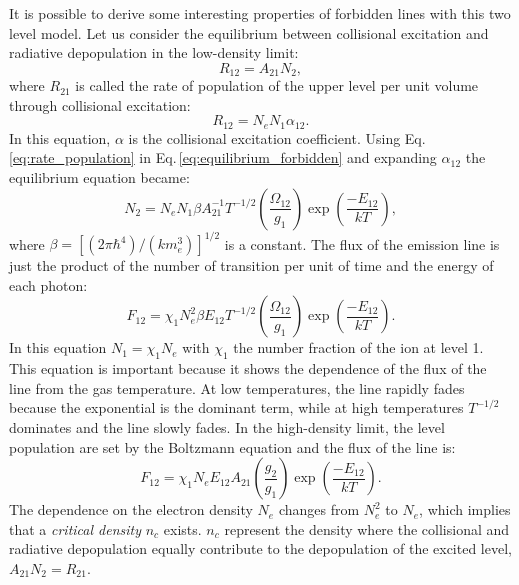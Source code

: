 \documentclass[../main.tex]{subfiles}
\begin{document}
It is possible to derive some interesting properties of forbidden lines with this two level model.
Let us consider the equilibrium between collisional excitation and radiative depopulation in the low-density limit:
\begin{equation}
    \label{eq:equilibrium_forbidden}
    R_{12} = A_{21}N_2,
\end{equation} 
where $R_{21}$ is called the rate of population of the upper level per unit volume through collisional excitation:
\begin{equation}
    \label{eq:rate_population}
    R_{12} = N_eN_1 \alpha_{12}.
\end{equation}
In this equation, $\alpha$ is the collisional excitation coefficient.
Using Eq.\,\ref{eq:rate_population} in Eq.\,\ref{eq:equilibrium_forbidden} and expanding $\alpha_{12}$ the equilibrium equation became:
\begin{equation}
    \label{eq:equilibrium_forbidden2}
    N_2 = N_e N_1 \beta A_{21}^{-1}T^{-1/2}\left(\frac{\Omega_{12}}{g_1}\right)\exp\left(\frac{-E_{12}}{kT}\right),
\end{equation}
where $\beta = [(2\pi \hbar^4)/(km_e^3)]^{1/2}$ is a constant.
The flux of the emission line is just the product of the number of transition per unit of time and the energy of each photon:
\begin{equation}
    \label{eq:flux}
    F_{12} = \chi_1 N_e^2 \beta E_{12} T^{-1/2} \left(\frac{\Omega_{12}}{g_1}\right) \exp\left(\frac{-E_{12}}{kT}\right).
\end{equation}
In this equation $N_1 = \chi_1N_e$ with $\chi_1$ the number fraction of the ion at level 1.
This equation is important because it shows the dependence of the flux of the line from the gas temperature.
At low temperatures, the line rapidly fades because the exponential is the dominant term, while at high temperatures $T^{-1/2}$ dominates and the line slowly fades.
In the high-density limit, the level population are set by the Boltzmann equation and the flux of the line is:
\begin{equation}
    \label{eq:flux_boltz}
    F_{12} = \chi_1 N_e E_{12} A_{21} \left(\frac{g_2}{g_1}\right) \exp\left(\frac{-E_{12}}{kT}\right).
\end{equation}
The dependence on the electron density $N_e$ changes from $N_e^2$ to $N_e$, which implies that a \emph{critical density} $n_c$ exists. 
$n_c$ represent the density where the collisional and radiative depopulation equally contribute to the depopulation of the excited level,  $A_{21} N_2 = R_{21}$.
\end{document}
